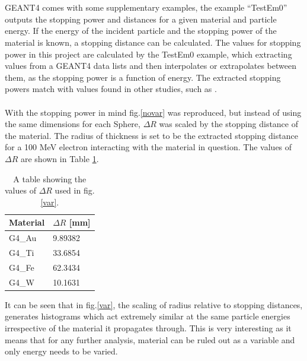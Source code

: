 \documentclass[12pt,a4paper]{article}
\begin{document}
\\\\
\noindent GEANT4 comes with some supplementary examples, the example ``TestEm0'' \cite{emo} outputs the stopping power and distances for a given material and particle energy. If the energy of the incident particle and the stopping power of the material is known, a stopping distance can be calculated. The values for stopping power in this project are calculated by the TestEm0 example, which extracting values from a GEANT4 data lists and then interpolates or extrapolates between them, as the stopping power is a function of energy. The extracted stopping powers match with values found in other studies, such as \cite{stpdat}.
\\\\
\noindent With the stopping power in mind fig.\ref{novar} was reproduced, but instead of using the same dimensions for each Sphere, $\Delta R$ was scaled by the stopping distance of the material. The radius of thickness is set to be the extracted stopping distance for a 100 MeV electron interacting with the material in question. The values of $\Delta R$ are shown in Table \ref{rs}.
\newpage
\begin{table}[h!]
\centering
\begin{tabular}{|l|l|}
\hline
Material & $\Delta R$ [mm] \\ \hline
G4\_Au &  9.89382\\ \hline
G4\_Ti &  33.6854\\ \hline
G4\_Fe &  62.3434\\ \hline
G4\_W &  10.1631\\ \hline
\end{tabular}
\caption{A table showing the values of $\Delta R$ used in fig.\ref{var}.}
\label{rs}
\end{table}
\noindent It can be seen that in fig.\ref{var}, the scaling of radius relative to stopping distances, generates histograms which act extremely similar at the same particle energies irrespective of the material it propagates through. This is very interesting as it means that for any further analysis, material can be ruled out as a variable and only energy needs to be varied.
\\\\
\end{document}
